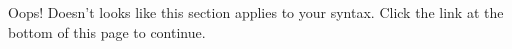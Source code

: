 \newpage
\texHeader
{}

Oops!\hypertarget{sec:2 tex}{} Doesn't looks like this section applies to your syntax. Click the link at the bottom of this page to continue.
